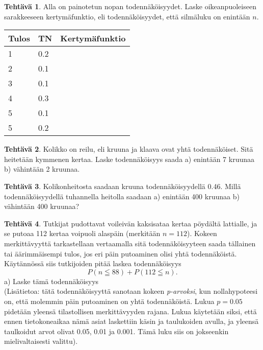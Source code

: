 \documentclass[12pt,leqno,a4paper,oneside]{amsart}
\theoremstyle{definition}
\newtheorem{exercise}{Tehtävä}
\theoremstyle{remark}
\numberwithin{equation}{section}
\begin{document}
\begin{exercise}
 Alla on painotetun nopan todennäköisyydet. Laske oikeanpuoleiseen sarakkeeseen kertymäfunktio, eli todennäköisyydet, että
 silmäluku on enintään $n.$\\
 \begin{center}
\begin{tabular}{l|l|l}
Tulos &TN &Kertymäfunktio\\
\hline
1 &0.2&\\
2 &0.1&\\
3 &0.1&\\
4 &0.3&\\
5 &0.1&\\
5 &0.2&
\end{tabular}
\end{center}
\end{exercise}

\begin{exercise}
 Kolikko on reilu, eli kruuna ja klaava ovat yhtä todennäköiset. Sitä heitetään kymmenen kertaa. Laske todennäköisyys
 saada a) enintään 7 kruunaa b) vähintään 2 kruunaa. 
\end{exercise}

\begin{exercise}
Kolikonheitosta saadaan kruuna todennäköisyydellä 0.46. Millä todennäköisyydellä tuhannella heitolla saadaan
a) enintään 400 kruunaa b) vähintään 400 kruunaa?
\end{exercise}

\begin{exercise}
 Tutkijat pudottavat voileivän kaksisataa kertaa pöydältä lattialle, ja se putoaa 112 kertaa voipuoli alaspäin
 (merkitään $n=112$).
 Kokeen merkittävyyttä tarkastellaan vertaamalla sitä todennäköisyyteen saada tällainen tai äärimmäisempi tulos, jos 
 eri päin putoaminen olisi yhtä todennäköistä. Käytännössä siis tutkijoiden pitää laskea todennäköisyys
 $$P(n \leqq 88) + P(112\leqq n).$$
 a) Laske tämä todennäköisyys\\
 (Lisätietoa: tätä todennäköisyyttä sanotaan kokeen \emph{p-arvoksi}, kun nollahypoteesi on, että molemmin päin 
 putoaminen on yhtä todennäköistä. Lukua $p=0.05$ pidetään yleensä tilastollisen merkittävyyden rajana. Lukua käytetään siksi, että ennen tietokoneaikaa
  nämä asiat laskettiin käsin ja taulukoiden avulla, ja yleensä taulkoidut arvot olivat 0.05, 0.01 ja 0.001. Tämä luku siis on
  jokseenkin mielivaltaisesti valittu).
\end{exercise}
\end{document}

